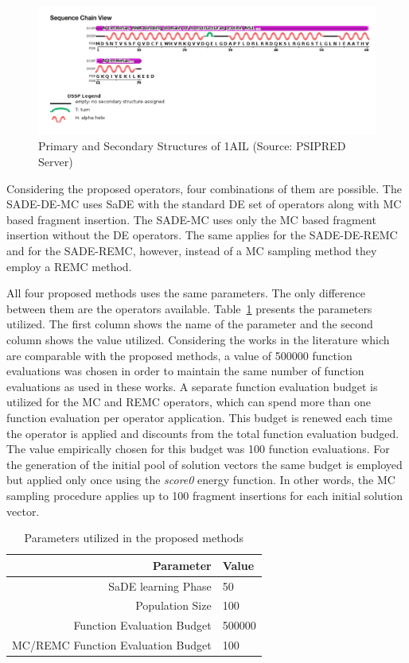 \begin{figure}[ht]
    \centering
    \includegraphics[scale=0.55]{Figuras/1ail-ss.png}
    \caption{Primary and Secondary Structures of 1AIL (Source: PSIPRED Server)}
    \label{fig:1ail-ss}
\end{figure}

Considering the proposed operators, four combinations of them are possible. The SADE-DE-MC uses \ac{SaDE} with the standard DE set of operators along with MC based fragment insertion. The SADE-MC uses only the MC based fragment insertion without the DE operators. The same applies for the SADE-DE-REMC and for the SADE-REMC, however, instead of a MC sampling method they employ a REMC method.

All four proposed methods uses the same parameters. The only difference between them are
the operators available. Table~\ref{tab:parameters} presents the parameters utilized.
The first column shows the name of the parameter and the second column shows the value utilized.
Considering the works in the literature which are comparable with the proposed methods,
a value of 500000 function evaluations was chosen in order to maintain the same number
of function evaluations as used in these works. A separate function evaluation budget
is utilized for the MC and REMC operators, which can spend more than one function evaluation
per operator application. This budget is renewed each time the operator is applied and
discounts from the total function evaluation budged. The value empirically chosen for this budget was 100 function evaluations.
For the generation of the initial pool
of solution vectors the same budget is employed but applied only once using the \textit{score0} energy function. In other words, the MC sampling procedure
applies up to 100 fragment insertions for each initial solution vector.

\begin{table}[ht]
    \centering
    \begin{tabular}{r|l} \hline \hline
        Parameter & Value \\ \hline \hline
        SaDE learning Phase & 50 \\ \hline
        Population Size & 100 \\ \hline
        Function Evaluation Budget & 500000 \\ \hline
        MC/REMC Function Evaluation Budget & 100 \\ \hline \hline
    \end{tabular}
    \caption{Parameters utilized in the proposed methods}
    \label{tab:parameters}
\end{table}


